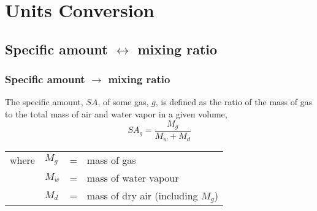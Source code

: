 \section{Units Conversion}
\subsection{Specific amount $\leftrightarrow$ mixing ratio}
\subsubsection{Specific amount $\rightarrow$ mixing ratio}
The specific amount, $SA$, of some gas, $g$, is defined as the ratio of the mass of gas to the total mass of air and water vapor in a given volume,
\begin{equation}
  SA_g = \frac{M_g}{M_w + M_d}
  \label{eqn:SA_defn}
\end{equation}
\begin{tabular}{llcl}
  where & $M_g$ & = & mass of gas\\
        & $M_w$ & = & mass of water vapour\\
        & $M_d$ & = & mass of dry air (including $M_g$)
\end{tabular}

